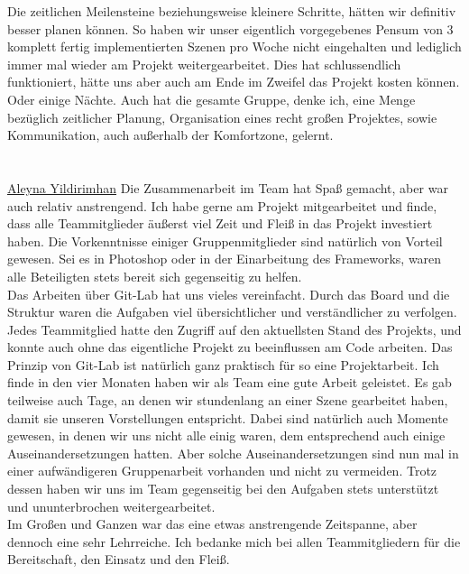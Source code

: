 Die zeitlichen Meilensteine beziehungsweise kleinere Schritte, hätten wir definitiv besser planen können. So haben wir unser eigentlich vorgegebenes Pensum von 3 komplett fertig implementierten Szenen pro Woche nicht eingehalten und lediglich immer mal wieder am Projekt weitergearbeitet. Dies hat schlussendlich funktioniert, hätte uns aber auch am Ende im Zweifel das Projekt kosten können. Oder einige Nächte.
Auch hat die gesamte Gruppe, denke ich, eine Menge bezüglich zeitlicher Planung, Organisation eines recht großen Projektes, sowie Kommunikation, auch außerhalb der Komfortzone, gelernt.\\
\\
\\
\underline{Aleyna Yildirimhan}
Die Zusammenarbeit im Team hat Spaß gemacht, aber war auch relativ anstrengend. Ich habe gerne am Projekt mitgearbeitet und finde, dass alle Teammitglieder äußerst viel Zeit und Fleiß in das Projekt investiert haben. Die Vorkenntnisse einiger Gruppenmitglieder sind natürlich von Vorteil gewesen. Sei es in Photoshop oder in der Einarbeitung des Frameworks, waren alle Beteiligten stets bereit sich gegenseitig zu helfen. \\
Das Arbeiten über Git-Lab hat uns vieles vereinfacht. Durch das Board und die Struktur waren die Aufgaben viel übersichtlicher und verständlicher zu verfolgen. Jedes Teammitglied hatte den Zugriff auf den aktuellsten Stand des Projekts, und konnte auch ohne das eigentliche Projekt zu beeinflussen am Code arbeiten. Das Prinzip von Git-Lab ist natürlich ganz praktisch für so eine Projektarbeit. \newpage
Ich finde in den vier Monaten haben wir als Team eine gute Arbeit geleistet. Es gab teilweise auch Tage, an denen wir stundenlang an einer Szene gearbeitet haben, damit sie unseren Vorstellungen entspricht. Dabei sind natürlich auch Momente gewesen, in denen wir uns nicht alle einig waren, dem entsprechend auch einige Auseinandersetzungen hatten. Aber solche Auseinandersetzungen sind nun mal in einer aufwändigeren Gruppenarbeit vorhanden und nicht zu vermeiden. Trotz dessen haben wir uns im Team gegenseitig bei den Aufgaben stets unterstützt und ununterbrochen weitergearbeitet. \\
Im Großen und Ganzen war das eine etwas anstrengende Zeitspanne, aber dennoch eine sehr Lehrreiche. Ich bedanke mich bei allen Teammitgliedern für die Bereitschaft, den Einsatz und den Fleiß.